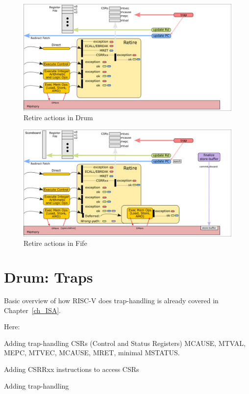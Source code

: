 \begin{figure}[htbp]
  \centerline{\includegraphics[width=6in,angle=0]{Figures/Fig_Retire_Layers_1}}
  \caption{\label{Fig_Retire_Drum}Retire actions in Drum}
\end{figure}

\begin{figure}[htbp]
  \centerline{\includegraphics[width=6in,angle=0]{Figures/Fig_Retire_Layers_1_2}}
  \caption{\label{Fig_Retire_Fife}Retire actions in Fife}
\end{figure}


\section{Drum: Traps}

Basic overview of how RISC-V does trap-handling is already covered in Chapter~\ref{ch_ISA}.

Here:

\begin{tightlist}

 \item Adding trap-handling CSRs (Control and Status Registers)
     MCAUSE, MTVAL, MEPC, MTVEC, MCAUSE, MRET, minimal MSTATUS.

 \item Adding CSRRxx instructions to access CSRs

 \item Adding trap-handling

\end{tightlist}

